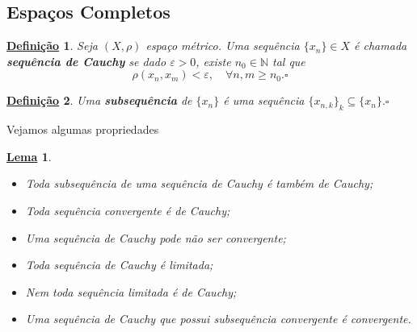 \documentclass{article}
\newtheorem*{def*}{\underline{Defini\c c\~ao}}
\newtheorem*{lemma*}{\underline{Lema}}
\begin{document}
\subsection{Espaços Completos}
 \begin{def*}
   Seja \((X, \rho )\) espaço métrico. Uma sequência \(\{x_{n}\}\in X\) é chamada \textbf{sequência de Cauchy }se dado \(\varepsilon > 0\), existe \(n_{0}\in \mathbb{N}\) tal que 
   \[
     \rho (x_{n}, x_{m}) < \varepsilon ,\quad \forall n, m\geq n_{0}.\square
   \]
 \end{def*}
 \begin{def*}
   Uma \textbf{subsequência} de \(\{x_{n}\}\) é uma sequência \(\{x_{n, k}\}_{k}\subseteq{\{x_{n}\}}.\square\)
 \end{def*}
Vejamos algumas propriedades
\begin{lemma*}
 \begin{itemize}
   \item[1)] Toda subsequência de uma sequência de Cauchy é também de Cauchy;
   \item[2)] Toda sequência convergente é de Cauchy;
   \item[3)] Uma sequência de Cauchy pode não ser convergente;
   \item[4)] Toda sequência de Cauchy é limitada;
   \item[5)] Nem toda sequência limitada é de Cauchy;
   \item[6)] Uma sequência de Cauchy que possui subsequência convergente é convergente.
 \end{itemize}
\end{lemma*}
\end{document}
